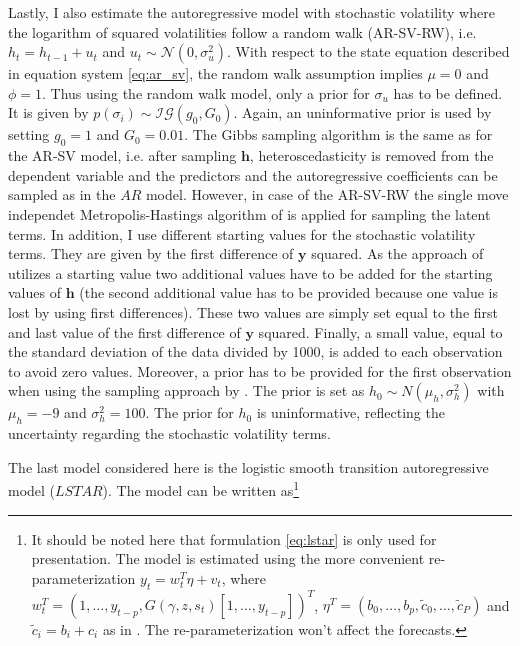 \documentclass[12pt,letterpaper,fleqn]{article}           %
\begin{document}
Lastly, I also estimate the autoregressive model with stochastic volatility where the logarithm of squared volatilities follow a random walk (AR-SV-RW), i.e. $h_t = h_{t-1} + u_t$ and $u_t \sim \mathcal{N}(0, \sigma_u^2).$ With respect to the state equation described in equation system \eqref{eq:ar_sv}, the random walk assumption implies $\mu = 0$ and $\phi = 1$. 
Thus using the random walk model, only a prior for $\sigma_u$ has to be defined. It is given by $p(\sigma_i) \sim \mathcal{IG}(g_0, G_0)$. Again, an uninformative prior is used by setting $g_0 = 1$ and $G_0 = 0.01$. The Gibbs sampling algorithm is the same as for the AR-SV model, i.e. after sampling $\bm{h}$, heteroscedasticity is removed from the dependent variable and the predictors and the autoregressive coefficients can be sampled as in the $AR$ model. However, in case of the AR-SV-RW the single move independet Metropolis-Hastings algorithm of \textcite{jac94} is applied for sampling the latent terms. %
In addition, I use different starting values for the stochastic volatility terms. They are given by the first difference of $\bm{y}$ squared. As the approach of \textcite{jac94} utilizes a starting value two additional values have to be added for the starting values of $\bm{h}$ (the second additional value has to be provided because one value is lost by using first differences). These two values are simply set equal to the first and last value of the first difference of $\bm{y}$ squared. Finally, a small value, equal to the standard deviation of the data divided by 1000, is added to each observation to avoid zero values. 
Moreover, a prior has to be provided for the first observation when using the sampling approach by \textcite{jac94}. The prior is set as $h_0 \sim N(\mu_h, \sigma_h^2)$ with $\mu_h = -9$ and $\sigma_h^2 = 100$. The prior for $h_0$ is uninformative, reflecting the uncertainty regarding the stochastic volatility terms.  %

The last model considered here is the logistic smooth transition autoregressive model ($LSTAR$). The model can be written as\footnote{It should be noted here that formulation \eqref{eq:lstar} is only used for presentation. The model is estimated using the more convenient re-parameterization $y_t = w_t^T\eta + v_t$, where $w_t^T = (1,\ldots,y_{t-p},G(\gamma,z,s_t)[1,\ldots,y_{t-p}])^T$, $\eta^T = (b_0,\ldots,b_p,\tilde{c}_0,\ldots,\tilde{c}_P)$ and $\tilde{c}_i = b_i + c_i$ as in \textcite{lopes06}. The re-parameterization won't affect the forecasts.}
\end{document}
